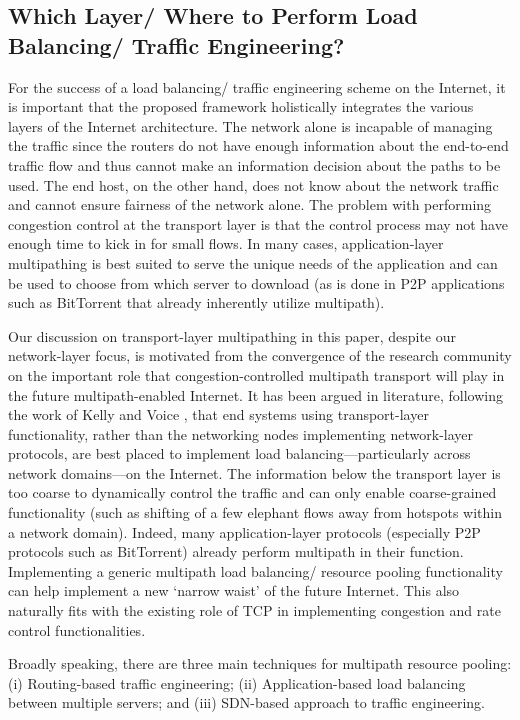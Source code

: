 \documentclass[10pt]{IEEEtran}
\begin{document}
\subsection{Which Layer/ Where to Perform Load Balancing/ Traffic Engineering?}

For the success of a load balancing/ traffic engineering scheme on the Internet, it is important that the proposed framework holistically integrates the various layers of the Internet architecture. The network alone is incapable of managing the traffic since the routers do not have enough information about the end-to-end traffic flow and thus cannot make an information decision about the paths to be used. The end host, on the other hand, does not know about the network traffic and cannot ensure fairness of the network alone. The problem with performing congestion control at the transport layer is that the control process may not have enough time to kick in for small flows. In many cases, application-layer multipathing is best suited to serve the unique needs of the application and can be used to choose from which server to download (as is done in P2P applications such as BitTorrent that already inherently utilize multipath). 

Our discussion on transport-layer multipathing in this paper, despite our network-layer focus, is motivated from the convergence of the research community on the important role that congestion-controlled multipath transport will play in the future multipath-enabled Internet. It has been argued in literature, following the work of Kelly and Voice \cite{kelly2005stability}, that end systems using transport-layer functionality, rather than the networking nodes implementing network-layer protocols, are best placed to implement load balancing---particularly across network domains---on the Internet. The information below the transport layer is too coarse to dynamically control the traffic and can only enable coarse-grained functionality (such as shifting of a few elephant flows away from hotspots within a network domain). Indeed, many application-layer protocols (especially P2P protocols such as BitTorrent) already perform multipath in their function. Implementing a generic multipath load balancing/ resource pooling functionality can help implement a new `narrow waist' of the future Internet. This also naturally fits with the existing role of TCP in implementing congestion and rate control functionalities. 

Broadly speaking, there are three main techniques for multipath resource pooling: (i) Routing-based traffic engineering; (ii) Application-based load balancing between multiple servers; and (iii) SDN-based approach to traffic engineering. 
\end{document}
